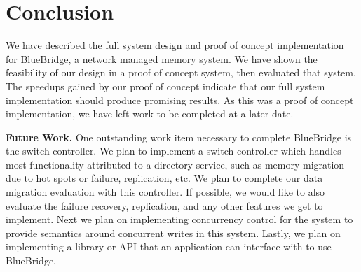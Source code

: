 \section{Conclusion}
\label{sec:conclusion}
We have described the full system design and proof of concept implementation for BlueBridge, a network managed memory system. We have shown the feasibility of our design in a proof of concept system, then evaluated that system. The speedups gained by our proof of concept indicate that our full system implementation should produce promising results. As this was a proof of concept implementation, we have left work to be completed at a later date.

\textbf{Future Work.} One outstanding work item necessary to complete BlueBridge is the switch controller. We plan to implement a switch controller which handles most functionality attributed to a directory service, such as memory migration due to hot spots or failure, replication, etc. We plan to complete our data migration evaluation with this controller. If possible, we would like to also evaluate the failure recovery, replication, and any other features we get to implement. Next we plan on implementing concurrency control for the system to provide semantics around concurrent writes in this system. Lastly, we plan on implementing a library or API that an application can interface with to use BlueBridge.

